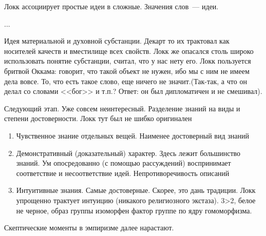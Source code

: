 Локк ассоциирует простые идеи в сложные. Значения слов~--- идеи.

...

Идея материальной и духовной субстанции. Декарт то их трактовал как носителей качеств и вместилище всех свойств. Локк же опасался столь широко использовать понятие субстанции, считал, что у нас нету его. Локк пользуется бритвой Оккама: говорит, что такой объект не нужен, ибо мы с ним не имеем дела вовсе. То, что есть такое слово, еще ничего не значит.(Так-так, а что он делал со словами <<бог>> и т.п.? Ответ: он был дипломатичен и не смешивал).

Следующий этап. Уже совсем неинтересный. Разделение знаний на виды и степени достоверности. Локк тут был не шибко оригинален

\begin{enumerate}
	\item Чувственное знание отдельных вещей. Наименее достоверный вид знаний
	\item Демонстративный (доказательный) характер. Здесь лежит большинство знаний. Ум опосредованно (с помощью рассуждений) воспринимает соответствие и несоответствие идей. Непротиворечивость описаний
	\item Интуитивные знания. Самые достоверные. Скорее, это дань традиции. Локк упрощенно трактует интуицию (никакого религиозного экстаза). 3>2, белое не черное, образ группы изоморфен фактор группе по ядру гомоморфизма.
\end{enumerate}
	
Скептические моменты в эмпиризме далее нарастают.
